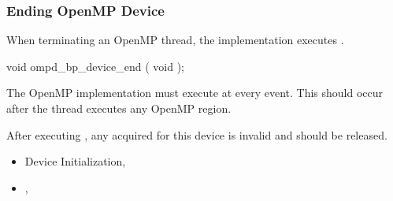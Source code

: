 \subsubsection{Ending OpenMP Device}
\label{subsubsec:ompd_bp_device_end}

\summary

When terminating an OpenMP thread, the implementation 
executes .

\format
\begin{cspecific}
\begin{ompSyntax}
void ompd_bp_device_end ( void );
\end{ompSyntax}
\end{cspecific}


\descr

The OpenMP implementation must execute 
 at every  event.
This should occur after the thread executes any OpenMP region.

After 
executing , any  acquired for this
device is invalid and should be released.

\crossreferences
\begin{itemize}
\item
  Device Initialization, 
\item
  ,
\end{itemize}

